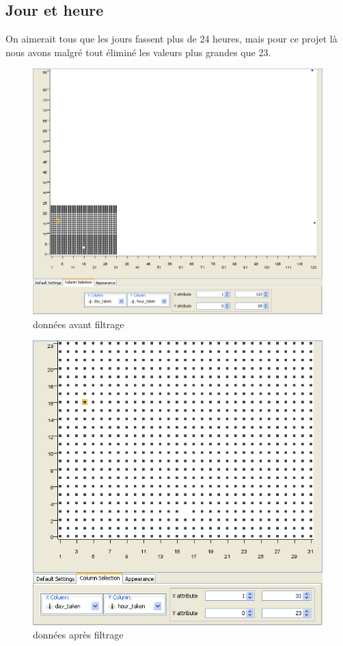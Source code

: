     \pagebreak
    \subsection{Jour et heure}

        On aimerait tous que les jours fassent plus de 24 heures, mais pour ce projet là nous avons malgré tout éliminé les valeurs plus grandes que 23.

        \begin{figure}[h]
            \centering
            \includegraphics[scale=0.27]{../screenshots/day_hour_before.png}
            \caption{données avant filtrage}
            \label{diagram:day_hour_before}
        \end{figure}

        \begin{figure}[h]
            \centering
            \includegraphics[scale=0.35]{../screenshots/day_hour_after.png}
            \caption{données apr\`es filtrage}
            \label{diagram:day_hour_after}
        \end{figure}

